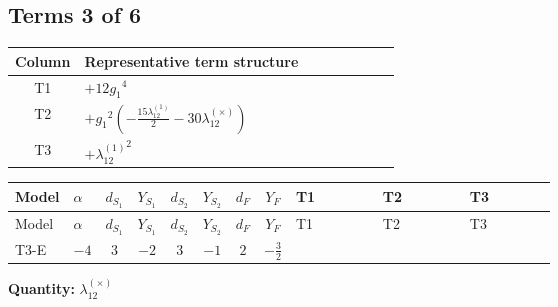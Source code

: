 \documentclass[8pt]{article}
\begin{document}
\begin{landscape}
\subsection*{Terms 3 of 6}
\begin{center}
\begin{tabular}{@{}c >{\raggedright\arraybackslash}p{0.82\linewidth}@{}}
\toprule
Column & Representative term structure \\
\midrule
T1 & \(\displaystyle +12 {g_1}^4\) \\
\midrule
T2 & \(\displaystyle +{g_1}^2 \left(-\frac{15 {\lambda_{12}^{(1)}}}{2}-30 {\lambda_{12}^{(\times)}}\right)\) \\
\midrule
T3 & \(\displaystyle +{\lambda_{12}^{(1)}}^2\) \\
\midrule
\bottomrule
\end{tabular}
\end{center}
\smallskip
\tiny
\begin{longtable}{@{}llcccccc >{\raggedright\arraybackslash}p{0.21\linewidth} >{\raggedright\arraybackslash}p{0.21\linewidth} >{\raggedright\arraybackslash}p{0.21\linewidth}@{}}
\toprule
Model & $\alpha$ & $d_{S_1}$ & $Y_{S_1}$ & $d_{S_2}$ & $Y_{S_2}$ & $d_F$ & $Y_F$ & T1 & T2 & T3 \\
\midrule
\endfirsthead
\toprule
Model & $\alpha$ & $d_{S_1}$ & $Y_{S_1}$ & $d_{S_2}$ & $Y_{S_2}$ & $d_F$ & $Y_F$ & T1 & T2 & T3 \\
\midrule
\endhead
T3-E & $-4$ & $3$ & $-2$ & $3$ & $-1$ & $2$ & $-\frac{3}{2}$ & \scriptsize\adjustbox{max width=\linewidth}{$\begin{gathered} +12 {g_1}^4\end{gathered}$} & \scriptsize\adjustbox{max width=\linewidth}{$\begin{gathered} +{g_1}^2 \left(-\frac{15 {\lambda_{12}^{(1)}}}{2}-30 {\lambda_{12}^{(\times)}}\right)\end{gathered}$} & \scriptsize\adjustbox{max width=\linewidth}{$\begin{gathered} +{\lambda_{12}^{(1)}}^2\end{gathered}$} \\
\midrule
\bottomrule
\end{longtable}
\clearpage
\noindent\textbf{Quantity: }$\lambda_{12}^{(\times)}$\par\smallskip

\end{landscape}
\end{document}
